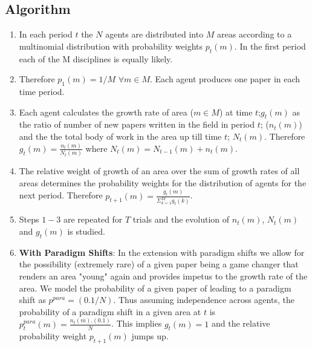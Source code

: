 \documentclass[letterpaper]{article} %
\begin{document}
\subsection{Algorithm}
\begin{enumerate}
\item
In each period $t$ the $N$ agents are distributed into $M$ areas according to a multinomial distribution with probability weights $p_t(m)$. In the first period each of the M disciplines is equally likely.
\item Therefore $p_1(m) = 1/M$  $\forall m \in M$. Each agent produces one paper in each time period.  
\item
Each agent calculates the growth rate of area ($m\in M$) at time $t$;$g_t(m)$ as the ratio of number of new papers written in the field in period $t$; ($n_t(m)$) and the the total body of work in the area up till time $t$; $N_t(m)$. Therefore $g_t(m) = \frac{n_t(m)}{N_t(m)}$ where $N_t(m) = N_{t-1}(m) + n_t(m)$. 
\item
The relative weight of growth of an area over the sum of growth rates of all areas determines the probability weights for the distribution of agents for the next period. Therefore $p_{t+1}(m) = \frac{g_t(m)}{\Sigma_{k=1}^{M} g_t(k)}$. 
\item
Steps $1-3$ are repeated for $T$ trials and the evolution of $n_t(m)$, $N_t(m)$ and $g_t(m)$ is studied.
\item
\textbf{With Paradigm Shifts}: In the extension with paradigm shifts we allow for the possibility (extremely rare) of a given paper being a game changer that renders an area "young" again and provides impetus to the growth rate of the area. We model the probability of a given paper of leading to a paradigm shift as $p^{para}=(0.1/N)$. Thus assuming independence across agents, the probability of a paradigm shift in a given area at $t$ is $p_{t}^{para}(m)= \frac{n_t(m).(0.1)}{N}$. This implies $g_t(m)=1$ and the relative probability weight $p_{t+1}(m)$ jumps up.
\end{enumerate}
\newpage
\end{document}
